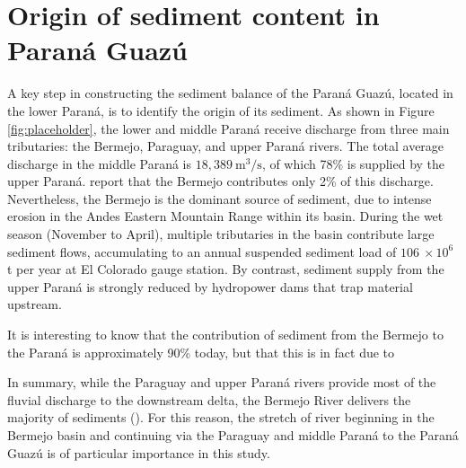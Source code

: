 \section{Origin of sediment content in Paraná Guazú}

A key step in constructing the sediment balance of the Paraná Guazú, located in the lower Paraná, is to identify the origin of its sediment. As shown in Figure \ref{fig:placeholder}, the lower and middle Paraná receive discharge from three main tributaries: the Bermejo, Paraguay, and upper Paraná rivers. The total average discharge in the middle Paraná is $18,389~\mathrm{m^3/s}$, of which 78\% is supplied by the upper Paraná. \citeauthor{lopezweibelSourcesTemporalDynamics2022} report that the Bermejo contributes only 2\% of this discharge. Nevertheless, the Bermejo is the dominant source of sediment, due to intense erosion in the Andes Eastern Mountain Range within its basin. During the wet season (November to April), multiple tributaries in the basin contribute large sediment flows, accumulating to an annual suspended sediment load of $106 ~\times 10^6$ t per year at El Colorado gauge station. By contrast, sediment supply from the upper Paraná is strongly reduced by hydropower dams that trap material upstream. 

It is interesting to know that the contribution of sediment from the Bermejo to the Paraná is approximately 90\% today, but that this is in fact due to

In summary, while the Paraguay and upper Paraná rivers provide most of the fluvial discharge to the downstream delta, the Bermejo River delivers the majority of sediments (\cite{lopezweibelSourcesTemporalDynamics2022}). For this reason, the stretch of river beginning in the Bermejo basin and continuing via the Paraguay and middle Paraná to the Paraná Guazú is of particular importance in this study.  












